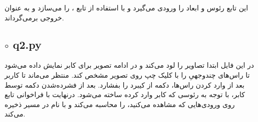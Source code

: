 \documentclass[a4paper,12pt]{article}
\begin{document}
	\subsubsection*{}
	این تابع رئوس و ابعاد 
	را ورودی می‌گیرد و با استفاده از تابع 
	،
	را می‌سازد و به عنوان خروجی بر‌می‌گرداند.
	\subsection*{$\circ$ q2.py}
	در این فایل ابتدا تصاویر را لود می‌کند و در ادامه تصویر
	برای کابر نمایش داده می‌شود تا راس‌های چندوجهیِ
	را با کلیک چپ روی تصویر مشخص کند. منتظر می‌ماند تا کاربر بعد از وارد کردن راس‌ها،
	دکمه 
	از کیبرد را بفشارد. بعد از فشرده‌شدن دکمه 
	توسط کابر، با توجه به رئوسی که کابر وارد کرده 
	ساخته می‌شود. درنهایت با فراخوانی تابع 
	روی ورودی‌هایی که مشاهده می‌کنید،
	را محاسبه می‌کند و با نام 
	در مسیر 
	ذخیره می‌کند.
\end{document}

